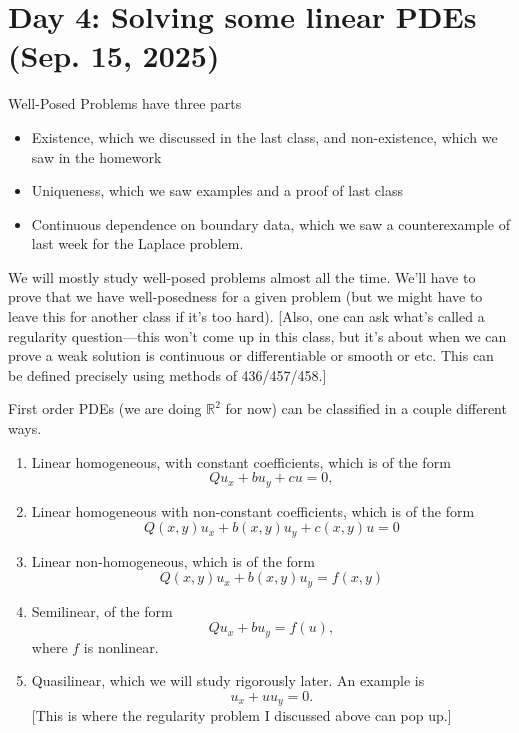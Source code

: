 \section{Day 4: Solving some linear PDEs (Sep. 15, 2025)}
Well-Posed Problems have three parts
\begin{itemize}

	\item Existence, which we discussed in the last class, and non-existence, which we saw in the homework
	\item Uniqueness, which we saw examples and a proof of last class
	\item Continuous dependence on boundary data, which we saw a counterexample of last week for the Laplace problem.
	

\end{itemize}
We will mostly study well-posed problems almost all the time. We'll have to prove that we have well-posedness for a given problem (but we might have to leave this for another class if it's too hard). [Also, one can ask what's called a regularity question---this won't come up in this class, but it's about when we can prove a weak solution is continuous or differentiable or smooth or etc. This can be defined precisely using methods of 436/457/458.]

First order PDEs (we are doing \( \mathbb{R}^{2} \) for now) can be classified in a couple different ways.
\begin{enumerate}

	\item Linear homogeneous, with constant coefficients, which is of the form
		\[ Qu_{x} + bu_{y} + cu = 0, \]
	\item Linear homogeneous with non-constant coefficients, which is of the form
		\[ Q(x, y) u_{x} + b(x, y)u_{y} + c(x, y)u = 0 \]
	\item Linear non-homogeneous, which is of the form
		\[ Q(x, y) u_{x} + b(x, y)u_{y} = f(x, y) \]
	\item Semilinear, of the form
		\[ Q u_{x} + b u_{y} = f(u), \]
		where \( f \) is nonlinear.
	\item Quasilinear, which we will study rigorously later. An example is
		\[ u_{x} + u u_{y} = 0. \]
		[This is where the regularity problem I discussed above can pop up.] 
\end{enumerate}


